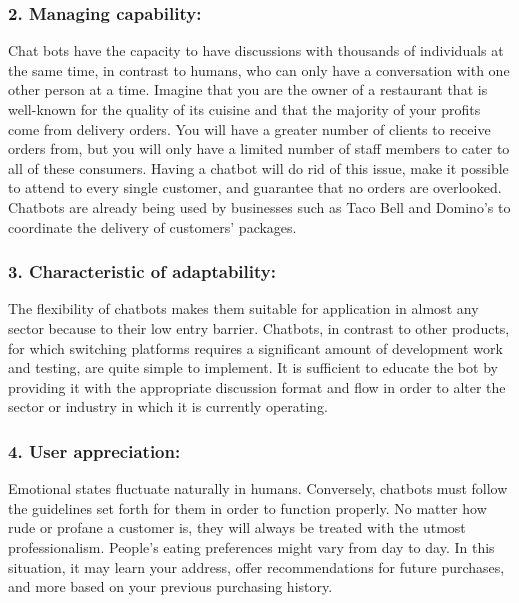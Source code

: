\subsubsection{2. Managing capability:}
Chat bots have the capacity to have discussions with thousands of individuals at the same time, in contrast to humans, who can only have a conversation with one other person at a time. Imagine that you are the owner of a restaurant that is well-known for the quality of its cuisine and that the majority of your profits come from delivery orders. You will have a greater number of clients to receive orders from, but you will only have a limited number of staff members to cater to all of these consumers. Having a chatbot will do rid of this issue, make it possible to attend to every single customer, and guarantee that no orders are overlooked. Chatbots are already being used by businesses such as Taco Bell and Domino's to coordinate the delivery of customers' packages.

\subsubsection{3. Characteristic of adaptability:}
The flexibility of chatbots makes them suitable for application in almost any sector because to their low entry barrier. Chatbots, in contrast to other products, for which switching platforms requires a significant amount of development work and testing, are quite simple to implement. It is sufficient to educate the bot by providing it with the appropriate discussion format and flow in order to alter the sector or industry in which it is currently operating.

\subsubsection{4. User appreciation:}
Emotional states fluctuate naturally in humans. Conversely, chatbots must follow the guidelines set forth for them in order to function properly. No matter how rude or profane a customer is, they will always be treated with the utmost professionalism. People's eating preferences might vary from day to day. In this situation, it may learn your address, offer recommendations for future purchases, and more based on your previous purchasing history.

